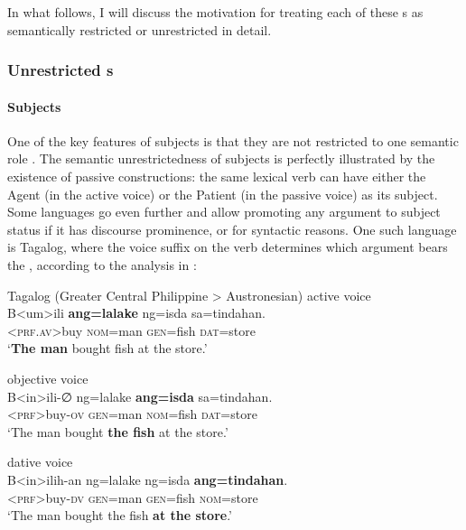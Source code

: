 \documentclass[output=paper]{../langscibook}
\begin{document}
 In what follows, I will discuss the motivation for treating each of these {\GF}s as semantically restricted or unrestricted in detail.
 
 \subsubsection{Unrestricted {\GF}s}
 
 \paragraph{Subjects}

 One of the key features of subjects is that they are not restricted to one semantic role \citep{fillmore:case}. The semantic unrestrictedness of subjects is perfectly illustrated by the existence of passive constructions: the same lexical verb can have either the Agent (in the active voice) or the Patient (in the passive voice) as its subject. Some languages go even further and allow promoting any argument to subject status if it has discourse prominence, or for syntactic reasons. One such language is Tagalog, where the voice suffix on the verb determines which argument bears the \SUBJ \GF, according to the analysis in \citet{Kroeger93}: 
 
 \newpage
 \ea\label{ex:gfs:tagalog} Tagalog (Greater Central Philippine > Austronesian)
    \ea active voice\\
    \gll B<um>ili \textbf{ang=lalake} ng=isda sa=tindahan.\\
    <\textsc{prf.av}>buy \textsc{nom}=man \textsc{gen}=fish \textsc{dat}=store\\
    \glt `\textbf{The man} bought fish at the store.'
    
    \ex objective voice\\
    \gll B<in>ili-∅ ng=lalake \textbf{ang=isda} sa=tindahan.\\
    <\textsc{prf}>buy-\textsc{ov} \textsc{gen}=man \textsc{nom}=fish \textsc{dat}=store\\
    \glt `The man bought \textbf{the fish} at the store.'
    
    \ex dative voice\\
    \gll B<in>ilih-an ng=lalake ng=isda \textbf{ang=tindahan}.\\
    <\textsc{prf}>buy-\textsc{dv} \textsc{gen}=man \textsc{gen}=fish \textsc{nom}=store\\
    \glt `The man bought the fish \textbf{at the store}.'
    
\end{document}
